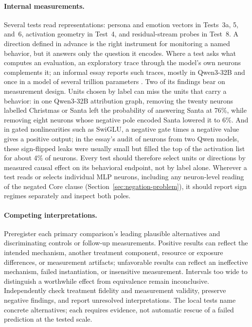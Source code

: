 \documentclass[11pt]{article}
\begin{document}
\paragraph{Internal measurements.} Several tests read representations: persona
and emotion vectors in Tests~3a, 5, and~6, activation geometry in Test~4, and
residual-stream probes in Test~8. A direction defined in advance is the right
instrument for monitoring a named behavior, but it answers only the question it
encodes. Where a test asks what computes an evaluation, an exploratory trace
through the model's own neurons complements it; an informal essay reports such traces, mostly in Qwen3-32B and once in a model of several trillion parameters \cite{cammarata2026clean}.
Two of its findings bear on measurement design. Units chosen by label can miss
the units that carry a behavior: in one Qwen3-32B attribution graph, removing
the twenty neurons labelled Christmas or Santa left the probability of
answering Santa at 76\%, while removing eight neurons whose negative pole
encoded Santa lowered it to 6\%. And in gated nonlinearities such as SwiGLU, a
negative gate times a negative value gives a positive output; in the essay's audit of neurons from two Qwen models, these sign-flipped leaks were usually small but filled the top of the activation list for about 4\% of neurons. Every test should therefore select units or directions by
measured causal effect on its behavioral endpoint, not by label alone. Wherever
a test reads or selects individual MLP neurons, including any neuron-level
reading of the negated Core clause (Section~\ref{sec:negation-problem}), it
should report sign regimes separately and inspect both poles.

\paragraph{Competing interpretations.} Preregister each primary comparison's
leading plausible alternatives and discriminating controls or follow-up
measurements. Positive results can reflect the intended mechanism, another
treatment component, resource or exposure differences, or measurement artifacts;
unfavorable results can reflect an ineffective mechanism, failed instantiation,
or insensitive measurement. Intervals too wide to distinguish a worthwhile
effect from equivalence remain inconclusive. Independently check treatment
fidelity and measurement validity, preserve negative findings, and report
unresolved interpretations. The local tests name concrete alternatives; each
requires evidence, not automatic rescue of a failed prediction at the tested
scale.
\end{document}

